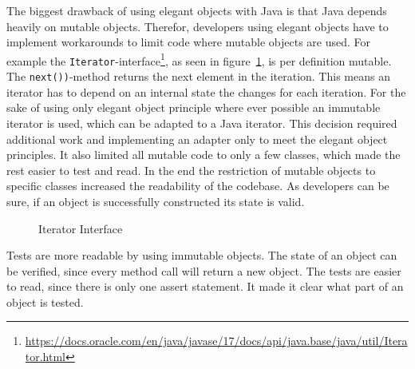 The biggest drawback of using elegant objects with Java is that Java depends heavily on mutable objects.
Therefor, developers using elegant objects have to implement workarounds to limit code where mutable objects are used.
For example the \texttt{Iterator}-interface\footnote{\url{https://docs.oracle.com/en/java/javase/17/docs/api/java.base/java/util/Iterator.html}}, as seen in figure\ \ref{fig:iterator}, is per definition mutable.
The \texttt{next())}-method returns the next element in the iteration.
This means an iterator has to depend on an internal state the changes for each iteration.
For the sake of using only elegant object principle where ever possible an immutable iterator is used, which can be adapted to a Java iterator.
This decision required additional work and implementing an adapter only to meet the elegant object principles.
It also limited all mutable code to only a few classes, which made the rest easier to test and read.
In the end the restriction of mutable objects to specific classes increased the readability of the codebase.
As developers can be sure, if an object is successfully constructed its state is valid.

\begin{figure}[h]
    \caption{Iterator Interface}
    
    \label{fig:iterator}
\end{figure}

Tests are more readable by using immutable objects.
The state of an object can be verified, since every method call will return a new object.
The tests are easier to read, since there is only one assert statement.
It made it clear what part of an object is tested.
